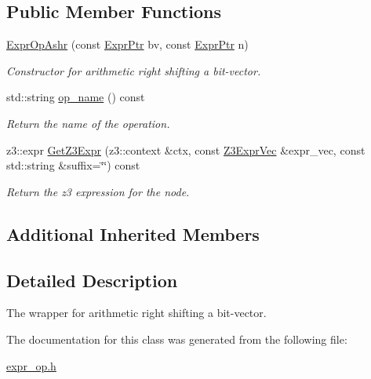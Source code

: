 \subsection*{Public Member Functions}
\begin{DoxyCompactItemize}
\item 
\mbox{\label{classilang_1_1_expr_op_ashr_a9470623bdb52e7c85ae5d024a42efd59}} 
\mbox{\hyperlink{classilang_1_1_expr_op_ashr_a9470623bdb52e7c85ae5d024a42efd59}{Expr\+Op\+Ashr}} (const \mbox{\hyperlink{classilang_1_1_expr_a85952b6a34620c4c8cab6bac9c9fdf8c}{Expr\+Ptr}} bv, const \mbox{\hyperlink{classilang_1_1_expr_a85952b6a34620c4c8cab6bac9c9fdf8c}{Expr\+Ptr}} n)
\begin{DoxyCompactList}\small\item\em Constructor for arithmetic right shifting a bit-\/vector. \end{DoxyCompactList}\item 
\mbox{\label{classilang_1_1_expr_op_ashr_a76afb857173396ec6891ee02e58791d0}} 
std\+::string \mbox{\hyperlink{classilang_1_1_expr_op_ashr_a76afb857173396ec6891ee02e58791d0}{op\+\_\+name}} () const
\begin{DoxyCompactList}\small\item\em Return the name of the operation. \end{DoxyCompactList}\item 
\mbox{\label{classilang_1_1_expr_op_ashr_a923adf66a885cc0b4045a5f861fc5ab4}} 
z3\+::expr \mbox{\hyperlink{classilang_1_1_expr_op_ashr_a923adf66a885cc0b4045a5f861fc5ab4}{Get\+Z3\+Expr}} (z3\+::context \&ctx, const \mbox{\hyperlink{namespaceilang_adc4eee919aa24fff882d03a48d733c19}{Z3\+Expr\+Vec}} \&expr\+\_\+vec, const std\+::string \&suffix=\char`\"{}\char`\"{}) const
\begin{DoxyCompactList}\small\item\em Return the z3 expression for the node. \end{DoxyCompactList}\end{DoxyCompactItemize}
\subsection*{Additional Inherited Members}


\subsection{Detailed Description}
The wrapper for arithmetic right shifting a bit-\/vector. 

The documentation for this class was generated from the following file\+:\begin{DoxyCompactItemize}
\item 
\mbox{\hyperlink{expr__op_8h}{expr\+\_\+op.\+h}}\end{DoxyCompactItemize}
